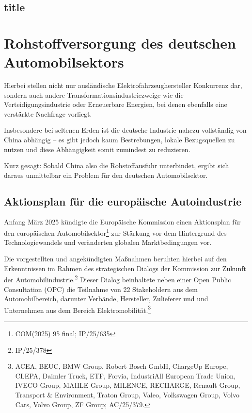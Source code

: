 \documentclass[12pt,a4paper,oneside]{book} %
\begin{document}
	\subsection{title}
	
	\section{Rohstoffversorgung des deutschen Automobilsektors}
	
	
	Hierbei stellen nicht nur ausländische Elektrofahrzeughersteller Konkurrenz dar, sondern auch andere Transformationsindustriezweige wie die Verteidigungsindustrie oder Erneuerbare Energien, bei denen ebenfalls eine verstärkte Nachfrage vorliegt.\autocite{Expertenkreis Automobilwirtschaft}
	
	Insbesondere bei seltenen Erden ist die deutsche Industrie nahezu vollständig von China abhängig -- es gibt jedoch kaum Bestrebungen, lokale Bezugsquellen zu nutzen und diese Abhängigkeit somit zumindest zu reduzieren.
	
	Kurz gesagt: Sobald China also die Rohstoffausfuhr unterbindet, ergibt sich daraus unmittelbar ein Problem für den deutschen Automobilsektor.
	
	
	
	
	\subsection{Aktionsplan für die europäische Autoindustrie}
	Anfang März 2025 kündigte die Europäische Kommission einen Aktionsplan für den europäischen Automobilsektor\footnote{COM(2025) 95 final; IP/25/635} zur Stärkung vor dem Hintergrund des Technologiewandels und veränderten globalen Marktbedingungen vor.
	
	Die vorgestellten und angekündigten Maßnahmen beruhten hierbei auf den Erkenntnissen im Rahmen des strategischen Dialogs der Kommission zur Zukunft der Automobilindustrie.\footnote{IP/25/378} Dieser Dialog beinhaltete neben einer Open Public Consultation (OPC) die Teilnahme von 22 Stakeholdern aus dem Automobilbereich, darunter Verbände, Hersteller, Zulieferer und und Unternehmen aus dem Bereich Elektromobilität.\footnote{ACEA, BEUC, BMW Group, Robert Bosch GmbH, ChargeUp Europe, CLEPA, Daimler Truck, ETF, Forvia, IndustriAll European Trade Union, IVECO Group, MAHLE Group, MILENCE, RECHARGE, Renault Group, Transport \& Environment, Traton Group, Valeo, Volkswagen Group, Volvo Cars, Volvo Group, ZF Group; AC/25/379.}
	
	
\end{document}
